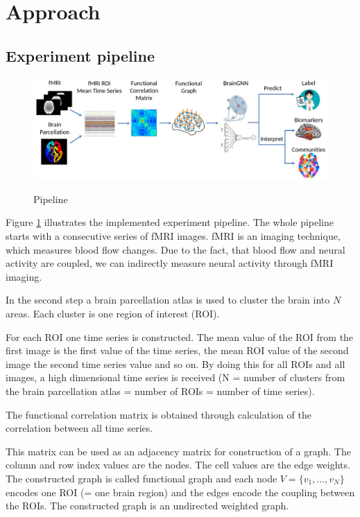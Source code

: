 \section{Approach} 
\label{approach}

\subsection{Experiment pipeline}
\label{approach:A}

\begin{figure}[ht]
	\centering
	\includegraphics[width=1.0\linewidth]{figures/pipeline.png}
	\caption{Pipeline}
	\cite{LI2021102233}
	\label{fig:pipeline}
\end{figure}


Figure \ref{fig:pipeline} illustrates the implemented experiment pipeline. The whole pipeline starts with a consecutive series of fMRI images. 
fMRI is an imaging technique, which measures blood flow changes. Due to the fact, that blood flow and neural activity are coupled, we can indirectly measure neural activity through fMRI imaging.

In the second step a brain parcellation atlas is used to cluster the brain into $N$ areas. Each cluster is one region of interest (ROI).

For each ROI one time series is constructed. The mean value of the ROI from the first image is the first value of the time series, the mean ROI value of the second image the second time series value and so on. By doing this for all ROIs and all images, a high dimensional time series is received (N = number of clusters from the brain parcellation atlas = number of ROIs = number of time series).

The functional correlation matrix is obtained through calculation of the correlation between all time series.

This matrix can be used as an adjacency matrix for construction of a graph. The column and row index values are the nodes. The cell values are the edge weights. The constructed graph is called functional graph and each node $V = \{v_1, ..., v_N\}$ encodes one ROI (= one brain region) and the edges encode the coupling between the ROIs. The constructed graph is an undirected weighted graph.

